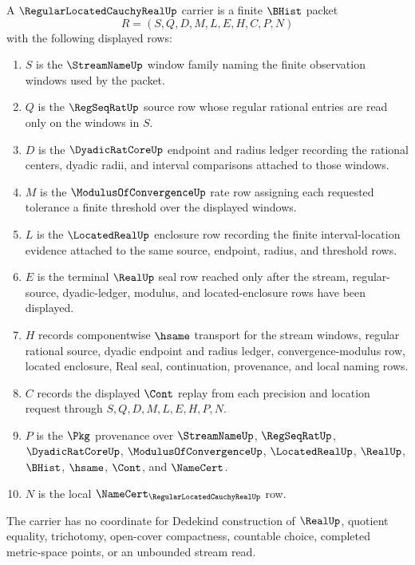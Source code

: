 \begin{definition}
\label{def:regular-located-cauchy-real-carrier}
A $\RegularLocatedCauchyRealUp$ carrier is a finite $\BHist$ packet
$$
R=(S,Q,D,M,L,E,H,C,P,N)
$$
with the following displayed rows:
\begin{enumerate}
\item $S$ is the $\StreamNameUp$ window family naming the finite observation windows used by the packet.
\item $Q$ is the $\RegSeqRatUp$ source row whose regular rational entries are read only on the windows in $S$.
\item $D$ is the $\DyadicRatCoreUp$ endpoint and radius ledger recording the rational centers, dyadic radii, and interval comparisons attached to those windows.
\item $M$ is the $\ModulusOfConvergenceUp$ rate row assigning each requested tolerance a finite threshold over the displayed windows.
\item $L$ is the $\LocatedRealUp$ enclosure row recording the finite interval-location evidence attached to the same source, endpoint, radius, and threshold rows.
\item $E$ is the terminal $\RealUp$ seal row reached only after the stream, regular-source, dyadic-ledger, modulus, and located-enclosure rows have been displayed.
\item $H$ records componentwise $\hsame$ transport for the stream windows, regular rational source, dyadic endpoint and radius ledger, convergence-modulus row, located enclosure, Real seal, continuation, provenance, and local naming rows.
\item $C$ records the displayed $\Cont$ replay from each precision and location request through $S,Q,D,M,L,E,H,P,N$.
\item $P$ is the $\Pkg$ provenance over $\StreamNameUp$, $\RegSeqRatUp$, $\DyadicRatCoreUp$, $\ModulusOfConvergenceUp$, $\LocatedRealUp$, $\RealUp$, $\BHist$, $\hsame$, $\Cont$, and $\NameCert$.
\item $N$ is the local $\NameCert_{\RegularLocatedCauchyRealUp}$ row.
\end{enumerate}
The carrier has no coordinate for Dedekind construction of $\RealUp$, quotient equality, trichotomy, open-cover compactness, countable choice, completed metric-space points, or an unbounded stream read.
\end{definition}

